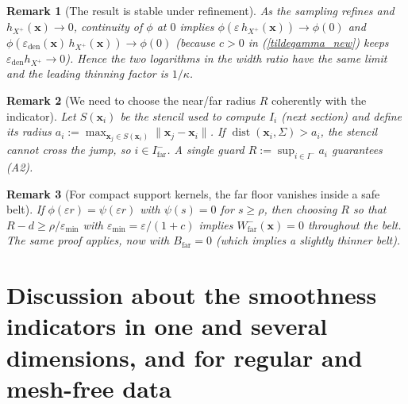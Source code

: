 \documentclass[preprint]{elsarticle}       %
\newtheorem{remark}{Remark}
\begin{document}
\begin{remark}[The result is stable under refinement]
As the sampling refines and $h_{X^{+}}(\mathbf{x})\to 0$, continuity of $\phi$ at $0$ implies
$\phi(\varepsilon\,h_{X^{+}}(\mathbf{x}))\to \phi(0)$ and
$\phi(\varepsilon_{\mathrm{den}}(\mathbf{x})\,h_{X^{+}}(\mathbf{x}))\to \phi(0)$ (because $c>0$ in (\ref{tildegamma_new})
keeps $\varepsilon_{\mathrm{den}}h_{X^{+}}\to 0$). Hence the two logarithms in the width ratio
have the same limit and the leading thinning factor is $1/\kappa$.
\end{remark}

\begin{remark}[We need to choose the near/far radius $R$ coherently with the indicator]
Let $S(\mathbf{x}_i)$ be the stencil used to compute $I_i$ (next section) and define its radius
$a_i:=\max_{\mathbf{x}_j\in S(\mathbf{x}_i)}\|\mathbf{x}_j-\mathbf{x}_i\|$. If $\operatorname{dist}(\mathbf{x}_i,\Sigma)>a_i$, the stencil cannot
cross the jump, so $i\in I^{-}_{\mathrm{far}}$. A single guard $R:=\sup_{i\in I^{-}} a_i$  guarantees (A2).
\end{remark}

\begin{remark}[For compact support kernels, the far floor vanishes inside a safe belt]
If $\phi(\varepsilon r)=\psi(\varepsilon r)$ with $\psi(s)=0$ for $s\ge \rho$, then choosing $R$ so that
$R-d\ge \rho/\varepsilon_{\min}$ with $\varepsilon_{\min}=\varepsilon/(1+c)$ implies
$W^{-}_{\mathrm{far}}(\mathbf{x})=0$ throughout the belt. The same proof applies, now with
$B_{\mathrm{far}}=0$ (which implies a slightly thinner belt).
\end{remark}


\section{Discussion about the smoothness indicators in one and several dimensions, and for regular and mesh-free data}\label{si_sec}
\end{document}
